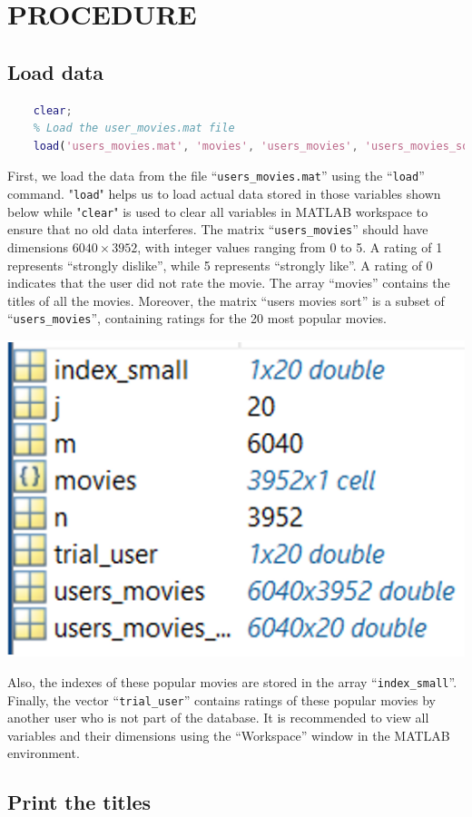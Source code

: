 \fontsize{13}{14}\selectfont
\section{PROCEDURE}

\subsection{Load data}

\begin{lstlisting}[style=StyleCode, language=MATLAB]
	% Clear the workspace
	clear;
	% Load the user_movies.mat file
	load('users_movies.mat', 'movies', 'users_movies', 'users_movies_sort', 'index_small', 'trial_user')
\end{lstlisting}

First, we load the data from the file “\texttt{users\_movies.mat}” using the “\texttt{load}” command. "\texttt{load}" helps us to load actual data stored in those variables shown below while "\texttt{clear}" is used to clear all variables in MATLAB workspace to ensure that no old data interferes. The matrix “\texttt{users\_movies}” should have dimensions $6040 \times 3952$, with integer values ranging from 0 to 5. A rating of 1 represents “strongly dislike”, while 5 represents “strongly like”. A rating of 0 indicates that the user did not rate the movie. The array “movies” contains the titles of all the movies. Moreover, the matrix “users movies sort” is a subset of “\texttt{users\_movies}”, containing ratings for the 20 most popular movies.

\begin{center}
	\includegraphics[width=.3\linewidth]{sections/pic/section3/1.png}
\end{center}

Also, the indexes of these popular movies are stored in the array “\texttt{index\_small}”. Finally, the vector “\texttt{trial\_user}” contains ratings of these popular movies by another user who is not part of the database. It is recommended to view all variables and their dimensions using the “Workspace” window in the MATLAB environment.

\subsection{Print the titles}

